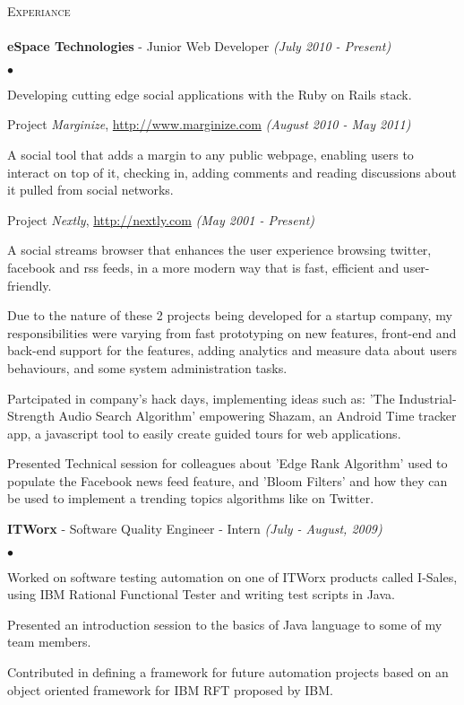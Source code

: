 \documentclass[letterpaper,12pt]{article}
\newcommand{\lineunder}{\vspace*{-8pt} \\ \hspace*{-8pt} \hrulefill \\}
\newcommand{\interval}[1] { \textit{(#1)} }
\newcommand{\header}[1]{{\hspace*{0pt}\vspace*{6pt} \textsc{#1}} \vspace*{-6pt} \lineunder}
\newcommand{\employer}[3]{{ \textbf{#1} - {#3} \interval{#2}\\ }}
\newenvironment{achievements}{\begin{list}{$\bullet$}{\topsep 0pt \itemsep -2pt}}{\vspace*{4pt}\end{list}}
\newenvironment{details}{\vspace*{-4pt} \begin{list}{\topsep 0pt \itemsep -2pt}}{\vspace*{4pt}\end{list}}
\begin{document}
\header{Experiance}
\employer{eSpace Technologies}{July 2010 - Present}{Junior Web Developer}
  \begin{achievements}
    \item Developing cutting edge social applications with the Ruby on Rails stack.
    \item Project \textit{Marginize}, \url{http://www.marginize.com} \interval{August 2010 - May 2011}
    \begin{details}
      \item A social tool that adds a margin to any public webpage, enabling users to interact on top of it, checking in, adding comments and reading discussions about it pulled from social networks. 
    \end{details}
    \item Project \textit{Nextly}, \url{http://nextly.com} \interval{May 2001 - Present}
    \begin{details}
      \item A social streams browser that enhances the user experience browsing twitter, facebook and rss feeds, in a more modern way that is fast, efficient and user-friendly. 
    \end{details}
    \item Due to the nature of these 2 projects being developed for a startup company, my responsibilities were varying from fast prototyping on new features, front-end and back-end support for the features, adding analytics and measure data about users behaviours, and some system administration tasks.
    \item Partcipated in company's hack days, implementing ideas such as: 'The Industrial-Strength Audio Search Algorithm' empowering Shazam, an Android Time tracker app, a javascript tool to easily create guided tours for web applications.
    \item Presented Technical session for colleagues about 'Edge Rank Algorithm' used to populate the Facebook news feed feature, and 'Bloom Filters' and how they can be used to implement a trending topics algorithms like on Twitter.
  \end{achievements}
\vspace*{4pt}
\employer{ITWorx}{July - August, 2009}{Software Quality Engineer - Intern}
  \begin{achievements}
    \item Worked on software testing automation on one of ITWorx products called I-Sales, using IBM Rational Functional Tester and writing test scripts in Java.
    \item Presented an introduction session to the basics of Java language to some of my team members.
    \item Contributed in defining a framework for future automation projects based on an object oriented framework for IBM RFT proposed by IBM.
  \end{achievements}
\vspace*{4pt}
\end{document}
